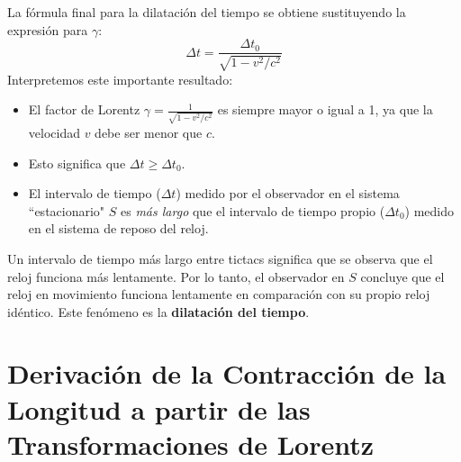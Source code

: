 \documentclass[11pt,a4paper]{article}
\begin{document}
La fórmula final para la dilatación del tiempo se obtiene sustituyendo la expresión para $\gamma$:
\[ \boxed{ \Delta t = \frac{\Delta t_0}{\sqrt{1 - v^2/c^2}} } \]
Interpretemos este importante resultado:
\begin{itemize}
    \item El factor de Lorentz $\gamma = \frac{1}{\sqrt{1 - v^2/c^2}}$ es siempre mayor o igual a 1, ya que la velocidad $v$ debe ser menor que $c$.
    \item Esto significa que $\Delta t \ge \Delta t_0$.
    \item El intervalo de tiempo ($\Delta t$) medido por el observador en el sistema ``estacionario" $S$ es \textit{más largo} que el intervalo de tiempo propio ($\Delta t_0$) medido en el sistema de reposo del reloj.
\end{itemize}
Un intervalo de tiempo más largo entre tictacs significa que se observa que el reloj funciona más lentamente. Por lo tanto, el observador en $S$ concluye que el reloj en movimiento funciona lentamente en comparación con su propio reloj idéntico. Este fenómeno es la \textbf{dilatación del tiempo}.


\section{Derivación de la Contracción de la Longitud a partir de las Transformaciones de Lorentz}
\end{document}
